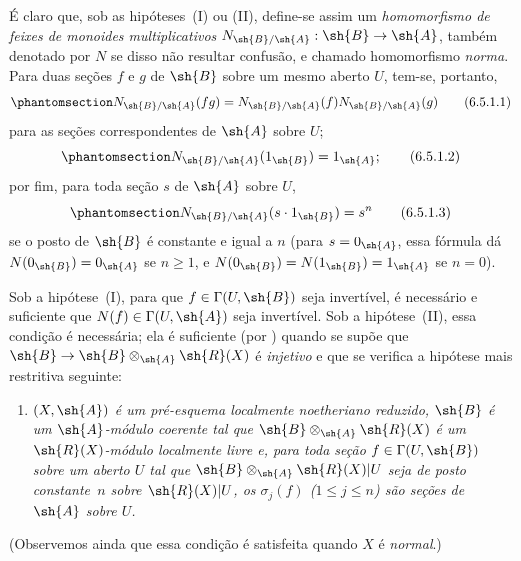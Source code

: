 \documentclass[oneside,10pt]{amsart}
\makeatletter
\renewcommand{\leq}{\leqslant}
\renewcommand{\geq}{\geqslant}
\newcommand{\ega@arrow}[2]{\mathchoice{#1}{#2}{#2}{#2}}
\renewcommand{\to}{\ega@arrow{\longrightarrow}{\rightarrow}}
\let\EGAOriginalLabel\label
\renewcommand{\label}[1]{\phantomsection\EGAOriginalLabel{#1}}
\makeatother
\begin{document}
\begin{env}[6.5.1]
É claro que, sob as hipóteses~(I) ou (II), define-se assim um \emph{homomorfismo de feixes de monoides multiplicativos} $N_{\sh{B}/\sh{A}}:\sh{B}\to\sh{A}$, também denotado por $N$ se disso não resultar confusão, e chamado homomorfismo \emph{norma}.
Para duas seções $f$ e $g$ de $\sh{B}$ sobre um mesmo aberto $U$, tem-se, portanto,
\[
\label{II.6.5.1.1}
  N_{\sh{B}/\sh{A}}(fg) = N_{\sh{B}/\sh{A}}(f)N_{\sh{B}/\sh{A}}(g)
\tag{6.5.1.1}
\]
para as seções correspondentes de $\sh{A}$ sobre $U$;
\[
\label{II.6.5.1.2}
  N_{\sh{B}/\sh{A}}(1_{\sh{B}}) = 1_{\sh{A}};
\tag{6.5.1.2}
\]
por fim, para toda seção $s$ de $\sh{A}$ sobre $U$,
\[
\label{II.6.5.1.3}
  N_{\sh{B}/\sh{A}}(s\cdot1_{\sh{B}}) = s^n
\tag{6.5.1.3}
\]
se o posto de $\sh{B}$ é constante e igual a $n$ (para $s=0_{\sh{A}}$, essa fórmula dá $N(0_{\sh{B}})=0_{\sh{A}}$ se $n\geq1$, e $N(0_{\sh{B}})=N(1_{\sh{B}})=1_{\sh{A}}$ se $n=0$).

Sob a hipótese~(I), para que $f\in\Gamma(U,\sh{B})$ seja invertível, é necessário e suficiente que $N(f)\in\Gamma(U,\sh{A})$ seja invertível.
Sob a hipótese~(II), essa condição é necessária;
ela é suficiente (por ) quando se supõe que $\sh{B}\to\sh{B}\otimes_{\sh{A}}\sh{R}(X)$ é \emph{injetivo} e que se verifica a hipótese mais restritiva seguinte:
\begin{enumerate}
  \item[{\rm(II~\emph{bis})}] \emph{$(X,\sh{A})$ é um pré-esquema localmente noetheriano reduzido, $\sh{B}$ é um $\sh{A}$-módulo coerente tal que $\sh{B}\otimes_{\sh{A}}\sh{R}(X)$ é um $\sh{R}(X)$-módulo localmente livre e, para toda seção $f\in\Gamma(U,\sh{B})$ sobre um aberto $U$ tal que $\sh{B}\otimes_{\sh{A}}\sh{R}(X)|U$ seja de posto constante~$n$ sobre $\sh{R}(X)|U$, os $\sigma_j(f)$ ($1\leq j\leq n$) são seções de $\sh{A}$ sobre $U$.}
\end{enumerate}

(Observemos ainda que essa condição é satisfeita quando $X$ é \emph{normal}.)
\end{env}
\end{document}
